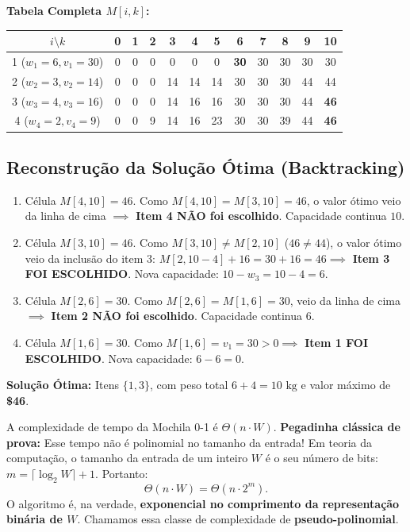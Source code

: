 \documentclass[11pt,a4paper]{article}
\begin{document}
\textbf{Tabela Completa $M[i, k]$:}
\begin{center}
\begin{tabular}{c|ccccccccccc}
\toprule
$i \setminus k$ & 0 & 1 & 2 & 3 & 4 & 5 & 6 & 7 & 8 & 9 & 10 \\
\midrule
1 ($w_1=6, v_1=30$) & 0 & 0 & 0 & 0 & 0 & 0 & \textbf{30} & 30 & 30 & 30 & 30 \\
2 ($w_2=3, v_2=14$) & 0 & 0 & 0 & 14 & 14 & 14 & 30 & 30 & 30 & 44 & 44 \\
3 ($w_3=4, v_3=16$) & 0 & 0 & 0 & 14 & 16 & 16 & 30 & 30 & 30 & 44 & \textbf{46} \\
4 ($w_4=2, v_4=9$)  & 0 & 0 & 9 & 14 & 16 & 23 & 30 & 30 & 39 & 44 & \textbf{46} \\
\bottomrule
\end{tabular}
\end{center}

\subsection*{Reconstrução da Solução Ótima (Backtracking)}
\begin{enumerate}
    \item Célula $M[4, 10] = 46$. Como $M[4, 10] = M[3, 10] = 46$, o valor ótimo veio da linha de cima $\implies$ \textbf{Item 4 NÃO foi escolhido}. Capacidade continua $10$.
    \item Célula $M[3, 10] = 46$. Como $M[3, 10] \ne M[2, 10]$ ($46 \ne 44$), o valor ótimo veio da inclusão do item 3: $M[2, 10 - 4] + 16 = 30 + 16 = 46 \implies$ \textbf{Item 3 FOI ESCOLHIDO}. Nova capacidade: $10 - w_3 = 10 - 4 = 6$.
    \item Célula $M[2, 6] = 30$. Como $M[2, 6] = M[1, 6] = 30$, veio da linha de cima $\implies$ \textbf{Item 2 NÃO foi escolhido}. Capacidade continua $6$.
    \item Célula $M[1, 6] = 30$. Como $M[1, 6] = v_1 = 30 > 0 \implies$ \textbf{Item 1 FOI ESCOLHIDO}. Nova capacidade: $6 - 6 = 0$.
\end{enumerate}

\textbf{Solução Ótima:} Itens $\{1, 3\}$, com peso total $6 + 4 = 10\text{ kg}$ e valor máximo de \textbf{\$46}.

\begin{teoria}
A complexidade de tempo da Mochila 0-1 é $\Theta(n \cdot W)$.
\textbf{Pegadinha clássica de prova:} Esse tempo não é polinomial no tamanho da entrada! Em teoria da computação, o tamanho da entrada de um inteiro $W$ é o seu número de bits: $m = \lceil \log_2 W \rceil + 1$.
Portanto:
\[
\Theta(n \cdot W) = \Theta(n \cdot 2^m).
\]
O algoritmo é, na verdade, \textbf{exponencial no comprimento da representação binária de $W$}. Chamamos essa classe de complexidade de \textbf{pseudo-polinomial}.
\end{teoria}
\end{document}
